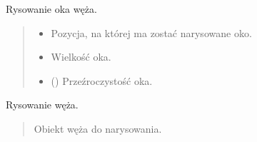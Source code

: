 \documentclass[letterpaper,10pt,polish]{sphinxmanual}
\begin{document}
\begin{fulllineitems}
\begin{fulllineitems}
\begin{quote}
\begin{description}
\begin{itemize}
\end{itemize}

\end{description}\end{quote}

\end{fulllineitems}


\begin{fulllineitems}
\label{\detokenize{main:main.Main.draw_eye}}
\pysigstartsignatures
{}
\pysigstopsignatures
\sphinxAtStartPar
Rysowanie oka węża.
\begin{quote}\begin{description}
\begin{itemize}
\item {} 
\sphinxAtStartPar
{} \textendash{} Pozycja, na której ma zostać narysowane oko.

\item {} 
\sphinxAtStartPar
{} \textendash{} Wielkość oka.

\item {} 
\sphinxAtStartPar
{} () \textendash{} Przeźroczystość oka.

\end{itemize}

\end{description}\end{quote}

\end{fulllineitems}


\begin{fulllineitems}
\label{\detokenize{main:main.Main.draw_snake}}
\pysigstartsignatures
{}
\pysigstopsignatures
\sphinxAtStartPar
Rysowanie węża.
\begin{quote}\begin{description}
\sphinxAtStartPar
{} \textendash{} Obiekt węża do narysowania.


\end{description}
\end{quote}
\end{fulllineitems}
\end{fulllineitems}
\end{document}
